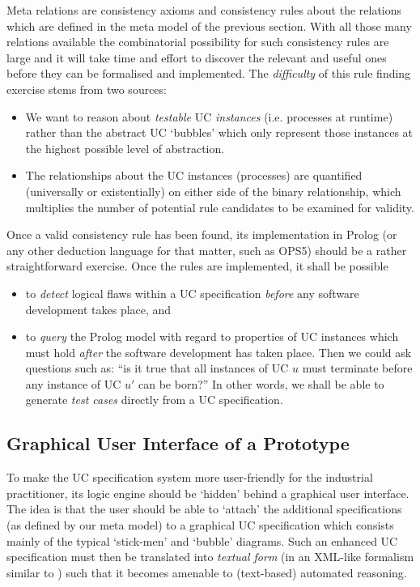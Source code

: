 Meta relations are consistency axioms and consistency rules about the 
relations which are defined in the meta model of the previous section. 
With all those many relations available the combinatorial possibility 
for such consistency rules are large and it will take time and effort 
to discover the relevant and useful ones before they can be formalised
and implemented. The \emph{difficulty} of this rule finding exercise 
stems from two sources:
\begin{itemize}
\item We want to reason about \emph{testable} UC \emph{instances} 
(i.e. processes at runtime) rather than the abstract UC `bubbles' 
which only represent those instances at the highest possible level 
of abstraction.
\item The relationships about the UC instances (processes) are quantified 
 (universally or existentially) on either side of the binary relationship, 
 which multiplies the number of potential rule candidates to be examined 
 for validity.
\end{itemize}
Once a valid consistency rule has been found, its implementation in 
{\sc Prolog} (or any other deduction language for that matter, such 
as {\sc OPS5}) should be a rather straightforward exercise. Once the 
rules are implemented, it shall be possible
\begin{itemize}
\item to \emph{detect} logical flaws within a UC specification 
 \emph{before} any software development takes place, and
\item to \emph{query} the {\sc Prolog} model with regard to properties 
 of UC instances which must hold \emph{after} the software development 
 has taken place. Then we could ask questions such as: ``is it true
 that all instances of UC $u$ must terminate before any instance of 
 UC $u'$ can be born?'' In other words, we shall be able to generate 
 \emph{test cases} directly from a UC specification. 
\end{itemize}

\subsection{Graphical User Interface of a Prototype}

To make the UC specification system more user-friendly for the 
industrial practitioner, its logic engine should be `hidden' behind 
a graphical user interface. The idea is that the user should be able 
to `attach' the additional specifications (as defined by our meta model) 
to a graphical UC specification which consists mainly of the typical 
`stick-men' and `bubble' diagrams. Such an enhanced UC specification 
must then be translated into \emph{textual form} (in an XML-like 
formalism similar to \cite{Bis} \cite{Rout}) such that it becomes 
amenable to (text-based) automated reasoning. 

